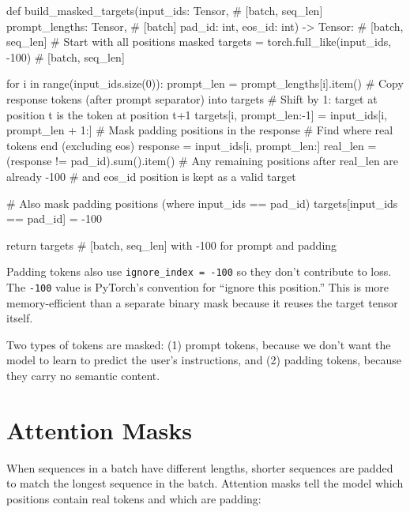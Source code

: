 \begin{pseudocode}
def build_masked_targets(input_ids: Tensor,       # [batch, seq_len]
                          prompt_lengths: Tensor,   # [batch]
                          pad_id: int,
                          eos_id: int) -> Tensor:   # [batch, seq_len]
    # Start with all positions masked
    targets = torch.full_like(input_ids, -100)  # [batch, seq_len]

    for i in range(input_ids.size(0)):
        prompt_len = prompt_lengths[i].item()
        # Copy response tokens (after prompt separator) into targets
        # Shift by 1: target at position t is the token at position t+1
        targets[i, prompt_len:-1] = input_ids[i, prompt_len + 1:]
        # Mask padding positions in the response
        # Find where real tokens end (excluding eos)
        response = input_ids[i, prompt_len:]
        real_len = (response != pad_id).sum().item()
        # Any remaining positions after real_len are already -100
        # and eos_id position is kept as a valid target

    # Also mask padding positions (where input_ids == pad_id)
    targets[input_ids == pad_id] = -100

    return targets  # [batch, seq_len] with -100 for prompt and padding
\end{pseudocode}

\begin{keyconcept}
  Padding tokens also use \texttt{ignore\_index = -100} so they don't
  contribute to loss. The \texttt{-100} value is PyTorch's convention
  for ``ignore this position.'' This is more memory-efficient than a
  separate binary mask because it reuses the target tensor itself.

  Two types of tokens are masked: (1) prompt tokens, because we don't
  want the model to learn to predict the user's instructions, and (2)
  padding tokens, because they carry no semantic content.
\end{keyconcept}

\section{Attention Masks}

When sequences in a batch have different lengths, shorter sequences are
padded to match the longest sequence in the batch. Attention masks tell
the model which positions contain real tokens and which are padding:

